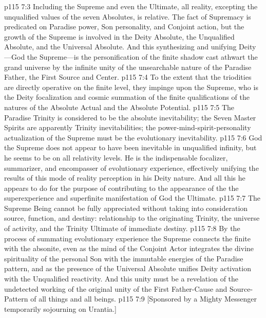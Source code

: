 \pc \vs p115 7:3 Including the Supreme and even the Ultimate, all reality, excepting the unqualified values of the seven Absolutes, is relative. The fact of Supremacy is predicated on Paradise power, Son personality, and Conjoint action, but the growth of the Supreme is involved in the Deity Absolute, the Unqualified Absolute, and the Universal Absolute. And this synthesizing and unifying Deity---God the Supreme---is the personification of the finite shadow cast athwart the grand universe by the infinite unity of the unsearchable nature of the Paradise Father, the First Source and Center.
\vs p115 7:4 To the extent that the triodities are directly operative on the finite level, they impinge upon the Supreme, who is the Deity focalization and cosmic summation of the finite qualifications of the natures of the Absolute Actual and the Absolute Potential.
\pc \vs p115 7:5 The Paradise Trinity is considered to be the absolute inevitability; the Seven Master Spirits are apparently Trinity inevitabilities; the power\hyp{}mind\hyp{}spirit\hyp{}personality actualization of the Supreme must be the evolutionary inevitability.
\vs p115 7:6 God the Supreme does not appear to have been inevitable in unqualified infinity, but he seems to be on all relativity levels. He is the indispensable focalizer, summarizer, and encompasser of evolutionary experience, effectively unifying the results of this mode of reality perception in his Deity nature. And all this he appears to do for the purpose of contributing to the appearance of the  the superexperience and superfinite manifestation of God the Ultimate.
\vs p115 7:7 The Supreme Being cannot be fully appreciated without taking into consideration source, function, and destiny: relationship to the originating Trinity, the universe of activity, and the Trinity Ultimate of immediate destiny.
\vs p115 7:8 By the process of summating evolutionary experience the Supreme connects the finite with the absonite, even as the mind of the Conjoint Actor integrates the divine spirituality of the personal Son with the immutable energies of the Paradise pattern, and as the presence of the Universal Absolute unifies Deity activation with the Unqualified reactivity. And this unity must be a revelation of the undetected working of the original unity of the First Father\hyp{}Cause and Source\hyp{}Pattern of all things and all beings.
\vsetoff
\vs p115 7:9 [Sponsored by a Mighty Messenger temporarily sojourning on Urantia.]
